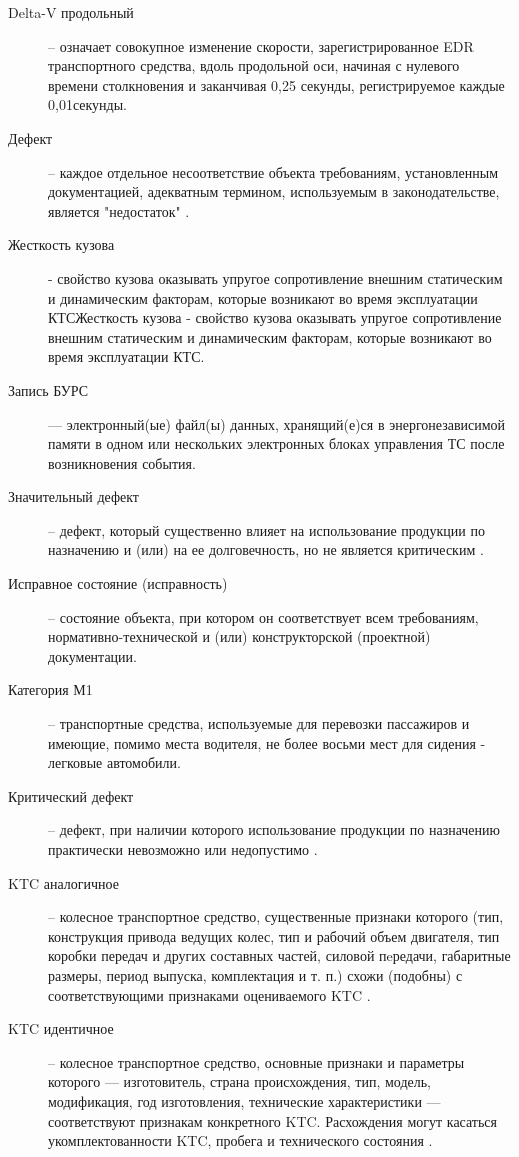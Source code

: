 \begin{description}
	\item[Delta-V продольный] -- означает совокупное изменение скорости, зарегистрированное EDR транспортного средства, вдоль продольной оси, начиная с нулевого времени столкновения и заканчивая 0,25 секунды, регистрируемое каждые 0,01секунды.
	\item
	[Дефект] --  каждое отдельное несоответствие объекта требованиям, установленным документацией, адекватным термином, используемым в законодательстве, является "недостаток" \cite{58197:gost}.
	\item[Жесткость кузова] - свойство кузова оказывать упругое сопротивление
	внешним статическим и динамическим факторам, которые возникают во время эксплуатации КТСЖесткость кузова - свойство кузова оказывать упругое сопротивление 	внешним статическим и динамическим факторам, которые возникают во время эксплуатации КТС.
	\item[Запись БУРС] --- электронный(ые) файл(ы) данных, хранящий(е)ся в энергонезависимой памяти в одном или нескольких электронных блоках управления ТС после возникновения события.
	\item
	[Значительный дефект] -- дефект, который существенно влияет на использование продукции по 	назначению и (или) на ее долговечность, но не является критическим  \cite{58197:gost}.
	\item
	[Исправное состояние (исправность)] -- состояние объекта, при котором он соответствует всем требованиям, нормативно-технической и (или) конструкторской (проектной) документации.
	\item
	[Категория М1] -- транспортные средства, используемые для перевозки пассажиров и имеющие, помимо места водителя, не более восьми мест для сидения - легковые автомобили.
	\item
	[Критический дефект] -- дефект, при наличии которого использование продукции по назначению 	практически невозможно или недопустимо \cite{15467:gost}.
	\item
	[KTC аналогичное]  -- колесное транспортное средство, существенные признаки которого (тип, конструкция привода ведущих колес, тип и рабочий объем двигателя, тип коробки передач и других составных частей, силовой пeредачи, габаритные размеры, период выпуска, комплектация и т. п.) схожи (подобны) с соответствующими признаками оцениваемого KTC \cite[часть III, п.1.2]{minust:2018}.
	\item
	[KTC идентичное]  -- колесное транспортное средство, основные признаки и параметры которого — изготовитель, страна происхождения, тип, модель, модификация,  год изготовления,  технические  характеристики —   соответствуют признакам конкретного KTC. Расхождения могут касаться укомплектованности KTC, пробега и технического состояния \cite[часть III, п. 1.2]{minust:2018}.

\end{description}
